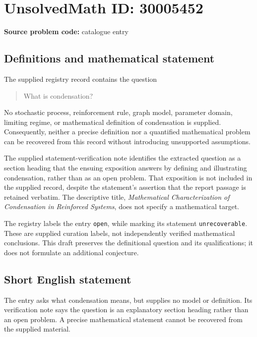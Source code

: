 \documentclass[11pt]{article}
\begin{document}
\section*{UnsolvedMath ID: 30005452}
\textbf{Source problem code:} catalogue entry
\subsection{Definitions and mathematical statement}
The supplied registry record contains the question
\begin{quote}
What is condensation?
\end{quote}
No stochastic process, reinforcement rule, graph model, parameter domain, limiting regime, or mathematical definition of condensation is supplied. Consequently, neither a precise definition nor a quantified mathematical problem can be recovered from this record without introducing unsupported assumptions.

The supplied statement-verification note identifies the extracted question as a section heading that the ensuing exposition answers by defining and illustrating condensation, rather than as an open problem. That exposition is not included in the supplied record, despite the statement's assertion that the report passage is retained verbatim. The descriptive title, \emph{Mathematical Characterization of Condensation in Reinforced Systems}, does not specify a mathematical target.

The registry labels the entry \texttt{open}, while marking its statement \texttt{unrecoverable}. These are supplied curation labels, not independently verified mathematical conclusions. This draft preserves the definitional question and its qualifications; it does not formulate an additional conjecture.
\subsection{Short English statement}
The entry asks what condensation means, but supplies no model or definition. Its verification note says the question is an explanatory section heading rather than an open problem. A precise mathematical statement cannot be recovered from the supplied material.
\end{document}
